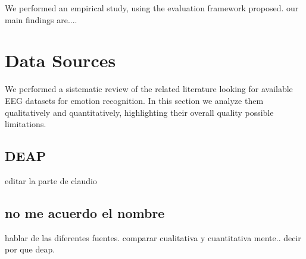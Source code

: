\documentclass{sig-alternate}
\begin{document}
We performed an empirical study, using the evaluation framework proposed. our main findings are....


\section{Data Sources}

We performed a sistematic review of the related literature looking for available EEG datasets for emotion recognition. In this section we analyze them qualitatively and quantitatively, highlighting their overall quality possible limitations. 

\subsection{DEAP}
editar la parte de claudio

\subsection{no me acuerdo el nombre}


hablar de las diferentes fuentes. comparar cualitativa y cuantitativa mente.. decir por que deap.




    
\end{document}
